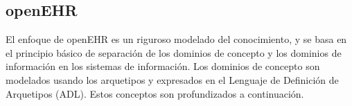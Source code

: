 \subsection{openEHR}

El enfoque de openEHR es un riguroso modelado del conocimiento, y se basa en el principio básico de separación de los dominios de concepto y los dominios de información en los sistemas de información. Los dominios de concepto son modelados usando los arquetipos y expresados en el Lenguaje de Definición de Arquetipos (ADL). Estos conceptos son profundizados a continuación.






